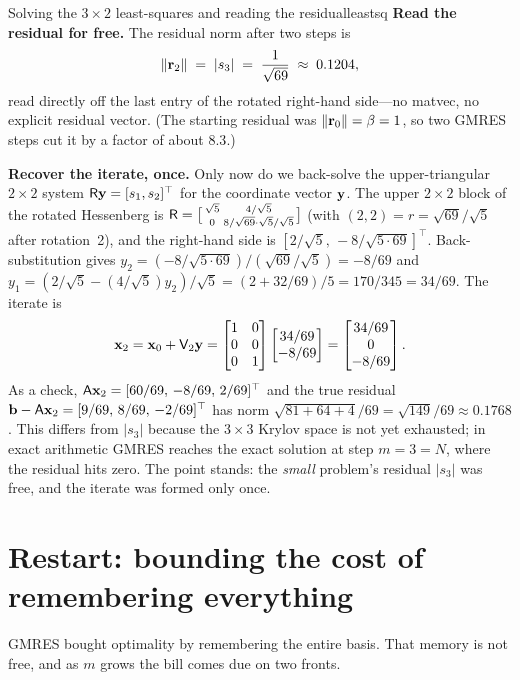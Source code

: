 \begin{workedexample}{Solving the $3\times2$ least-squares and reading the residual}{leastsq}
\textbf{Read the residual for free.} The residual norm after two steps is
\[
  \lVert\mathbf{r}_2\rVert\;=\;\lvert s_3\rvert\;=\;\frac{1}{\sqrt{69}}\;\approx\;0.1204,
\]
read directly off the last entry of the rotated right-hand side---no matvec, no
explicit residual vector. (The starting residual was $\lVert\mathbf{r}_0\rVert=\beta=1$, so two
GMRES steps cut it by a factor of about $8.3$.)

\textbf{Recover the iterate, once.} Only now do we back-solve the upper-triangular
$2\times2$ system $\mathsf{R}\mathbf{y}=[s_1,s_2]^{\top}$ for the coordinate vector $\mathbf{y}$. The
upper $2\times2$ block of the rotated Hessenberg is $\mathsf{R}=\bigl[\begin{smallmatrix}
\sqrt5 & 4/\sqrt5\\ 0 & 8/\sqrt{69}\cdot\sqrt5/\sqrt5\end{smallmatrix}\bigr]$ (with
$(2,2)=r=\sqrt{69}/\sqrt5$ after rotation~2), and the right-hand side is
$[2/\sqrt5,\,-8/\sqrt{5\cdot69}]^{\top}$. Back-substitution gives
$y_2=(-8/\sqrt{5\cdot69})/(\sqrt{69}/\sqrt5)=-8/69$ and
$y_1=(2/\sqrt5-(4/\sqrt5)y_2)/\sqrt5=(2+32/69)/5=170/345=34/69$. The iterate is
\[
  \mathbf{x}_2=\mathbf{x}_0+\mathsf{V}_2\mathbf{y}=\begin{bmatrix}1&0\\0&0\\0&1\end{bmatrix}
    \begin{bmatrix}34/69\\-8/69\end{bmatrix}=\begin{bmatrix}34/69\\0\\-8/69\end{bmatrix}.
\]
As a check, $\mathsf{A}\mathbf{x}_2=[60/69,\,-8/69,\,2/69]^{\top}$ and the true residual
$\mathbf{b}-\mathsf{A}\mathbf{x}_2=[9/69,\,8/69,\,-2/69]^{\top}$ has norm
$\sqrt{81+64+4}/69=\sqrt{149}/69\approx0.1768$. This differs from $|s_3|$ because the
$3\times3$ Krylov space is not yet exhausted; in exact arithmetic GMRES reaches the
exact solution at step $m=3=N$, where the residual hits zero. The point stands: the
\emph{small} problem's residual $|s_3|$ was free, and the iterate was formed only once.
\end{workedexample}

\section{Restart: bounding the cost of remembering everything}

GMRES bought optimality by remembering the entire basis. That memory is not free,
and as $m$ grows the bill comes due on two fronts.

